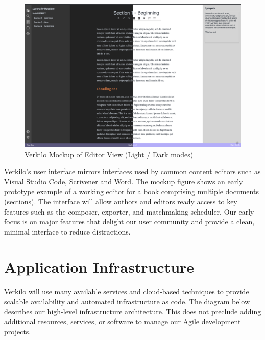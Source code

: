 \documentclass[11pt,openany]{book}
\begin{document}
\begin{figure}
\centering
\includegraphics{./media/verkilo-ui-dark-lite.png}
\caption{Verkilo Mockup of Editor View (Light / Dark modes)}
\end{figure}

Verkilo's user interface mirrors interfaces used by common content
editors such as Visual Studio Code, Scrivener and Word. The mockup
figure shows an early prototype example of a working editor for a book
comprising multiple documents (sections). The interface will allow
authors and editors ready access to key features such as the composer,
exporter, and matchmaking scheduler. Our early focus is on major
features that delight our user community and provide a clean, minimal
interface to reduce distractions.

\hypertarget{application-infrastructure}{%
\section{Application Infrastructure}\label{application-infrastructure}}

Verkilo will use many available services and cloud-based techniques to
provide scalable availability and automated infrastructure as code. The
diagram below describes our high-level infrastructure architecture. This
does not preclude adding additional resources, services, or software to
manage our Agile development projects.
\end{document}
